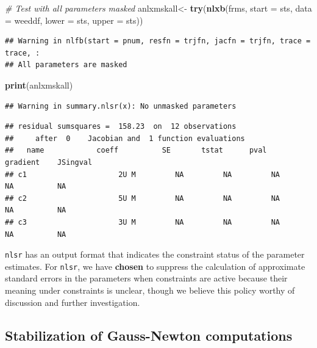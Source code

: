 \documentclass[
]{article}
\newenvironment{Shaded}{\begin{snugshade}}{\end{snugshade}}
\newcommand{\AttributeTok}[1]{\textcolor[rgb]{0.13,0.29,0.53}{#1}}
\newcommand{\CommentTok}[1]{\textcolor[rgb]{0.56,0.35,0.01}{\textit{#1}}}
\newcommand{\FunctionTok}[1]{\textcolor[rgb]{0.13,0.29,0.53}{\textbf{#1}}}
\newcommand{\NormalTok}[1]{#1}
\newcommand{\OtherTok}[1]{\textcolor[rgb]{0.56,0.35,0.01}{#1}}
\begin{document}
\begin{Shaded}
\begin{Highlighting}[]
\CommentTok{\# Test with all parameters masked}
\NormalTok{anlxmskall}\OtherTok{\textless{}{-}} \FunctionTok{try}\NormalTok{(}\FunctionTok{nlxb}\NormalTok{(frms, }\AttributeTok{start =}\NormalTok{ sts, }\AttributeTok{data =}\NormalTok{ weeddf, }\AttributeTok{lower =}\NormalTok{ sts, }\AttributeTok{upper =}\NormalTok{ sts))}
\end{Highlighting}
\end{Shaded}

\begin{verbatim}
## Warning in nlfb(start = pnum, resfn = trjfn, jacfn = trjfn, trace = trace, :
## All parameters are masked
\end{verbatim}

\begin{Shaded}
\begin{Highlighting}[]
\FunctionTok{print}\NormalTok{(anlxmskall)}
\end{Highlighting}
\end{Shaded}

\begin{verbatim}
## Warning in summary.nlsr(x): No unmasked parameters
\end{verbatim}

\begin{verbatim}
## residual sumsquares =  158.23  on  12 observations
##     after  0    Jacobian and  1 function evaluations
##   name            coeff          SE       tstat      pval      gradient    JSingval   
## c1                     2U M         NA         NA         NA          NA          NA  
## c2                     5U M         NA         NA         NA          NA          NA  
## c3                     3U M         NA         NA         NA          NA          NA
\end{verbatim}

\texttt{nlsr} has an output format that indicates the constraint status
of the parameter estimates. For \texttt{nlsr}, we have \textbf{chosen}
to suppress the calculation of approximate standard errors in the
parameters when constraints are active because their meaning under
constraints is unclear, though we believe this policy worthy of
discussion and further investigation.

\hypertarget{stabilization-of-gauss-newton-computations}{%
\subsection{Stabilization of Gauss-Newton
computations}\label{stabilization-of-gauss-newton-computations}}
\end{document}
